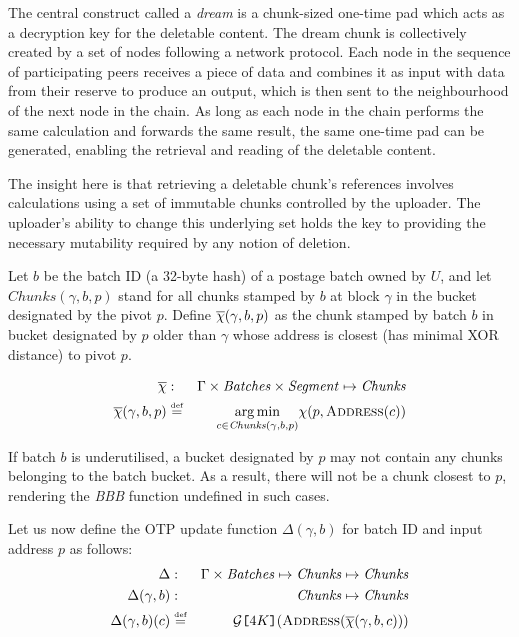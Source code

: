 
The central construct called a \emph{dream} is a chunk-sized one-time pad which acts as a decryption key for the deletable content. The dream chunk is collectively created by a set of nodes following a network protocol. Each node in the sequence of participating peers receives a piece of data and combines it as input with data from their reserve to produce an output, which is then sent to the neighbourhood of the next node in the chain. As long as each node in the chain performs the same calculation and forwards the same result, the same one-time pad can be generated, enabling the retrieval and reading of the deletable content.

The insight here is that retrieving a deletable chunk's references involves calculations using a set of immutable chunks controlled by the uploader. The uploader's ability to change this underlying set holds the key to providing the necessary mutability required by any notion of deletion. 
 
Let $b$ be the batch ID (a 32-byte hash) of a postage batch owned by $U$, and 
let $\mathit{Chunks}(\gamma,b,p)$ stand for all chunks stamped by $b$ at block $\gamma$ in the bucket designated by the pivot $p$. Define  $\overline{\Huge\chi}(\gamma,b,p)$ as the chunk stamped by batch $b$ in bucket designated by $p$ older than $\gamma$ whose address is closest (has minimal XOR distance) to pivot $p$.

\begin{eqnarray}
\overline{\Huge\chi}&:& \Gamma\times\mathit{Batches}\times \mathit{Segment} \mapsto \mathit{Chunks}\\
\overline{\Huge\chi}(\gamma,b,p)&\defeq &\underset{c\in \mathit{Chunks}(\gamma,b,p)}{\operatorname{arg\,min}}{\Large\chi}(p,\textsc{Address}(c))
\end{eqnarray}

If batch $b$ is underutilised, a bucket designated by $p$
may not contain any chunks belonging to the batch bucket.
As a result, there will not be a chunk closest to $p$, rendering the \emph{BBB} function undefined in such cases.

Let us now define the OTP update function $\Delta(\gamma,b)$
for batch ID and input address $p$ as follows: 
%
\begin{eqnarray}
{\Delta}&:&\Gamma\times\mathit{Batches}\mapsto\mathit{Chunks}\mapsto\mathit{Chunks}\\\
{\Delta}(\gamma, b)&:&\mathit{Chunks}\mapsto\mathit{Chunks}\\
\Delta(\gamma,b)(c)&\defeq&\mathcal{G}\idx{4K}(\textsc{Address}(\overline{\Huge\chi}(\gamma,b,c)))
\end{eqnarray}


